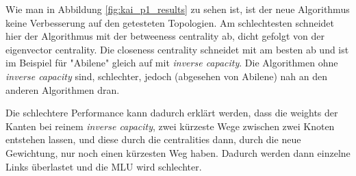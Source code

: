 \documentclass[sigconf, nonacm, review]{acmart}
\begin{document}
Wie man in Abbildung \ref{fig:kai_p1_results} zu sehen ist, ist der neue Algorithmus keine Verbesserung auf den getesteten Topologien.
Am schlechtesten schneidet hier der Algorithmus mit der betweeness centrality ab, dicht gefolgt von der eigenvector centrality.
Die closeness centrality schneidet mit am besten ab und ist im Beispiel f\"ur "Abilene" gleich auf mit \emph{inverse capacity}.
Die Algorithmen ohne \emph{inverse capacity} sind, schlechter, jedoch (abgesehen von Abilene) nah an den anderen Algorithmen dran.

Die schlechtere Performance kann dadurch erkl\"art werden, dass die weights der Kanten bei reinem \emph{inverse capacity}, zwei k\"urzeste Wege zwischen zwei Knoten entstehen lassen, und diese durch die centralities dann, durch die neue Gewichtung, nur noch einen k\"urzesten Weg haben.
Dadurch werden dann einzelne Links \"uberlastet und die MLU wird schlechter.
\end{document}
